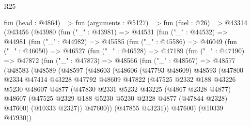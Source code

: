 \begin{lexlean}{R25}
\begin{coremodule}
  fun (head : @4864) =>
  fun (arguments : @5127) =>
  fun (fuel : @26) =>
  @43314
    (@43456
      (@43980
        (fun ("_" : @43981) =>
        @44531
          (fun ("_" : @44532) =>
          @44981
            (fun ("_" : @44982) =>
            @45585
              (fun ("_" : @45586) =>
              @46049
                (fun ("_" : @46050) =>
                @46527
                  (fun ("_" : @46528) =>
                  @47189
                    (fun ("_" : @47190) =>
                    @47872
                      (fun ("_" : @47873) =>
                      @48566
                        (fun ("_" : @48567) =>
                        @48577
                          (@48583
                            (@48589
                              (@48597
                                (@48603
                                  (@48606
                                    (@47793 @48609)
                                    @48593
                                    (@47800
                                      @2334
                                      @47414
                                      @43228
                                      @47792
                                      @48609
                                      @47822
                                      (@47525
                                        @2332
                                        @188
                                        @43226
                                        @5230
                                        @48607
                                        @4877
                                        (@47830
                                          @2331
                                          @5232
                                          @43225
                                          (@4867 @2328 @4877)
                                          @48607
                                          (@47525
                                            @2329
                                            @188
                                            @5230
                                            @5230
                                            @2328
                                            @4877
                                            (@47844 @2328)
                                            @47600)
                                          (@10333 @2327))
                                        @47600))
                                    (@47855 @43231))
                                  @47600)
                                (@10339 @47930))

\end{coremodule}
\end{lexlean}
